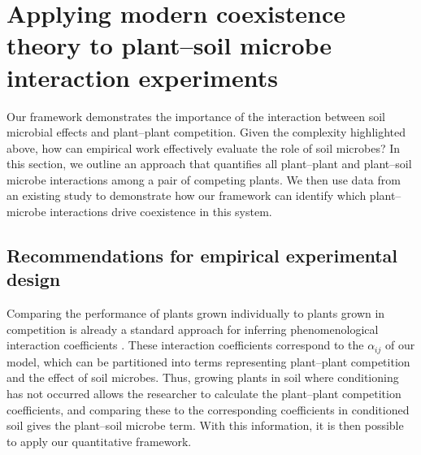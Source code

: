 \section{Applying modern coexistence theory to plant--soil microbe interaction experiments}
Our framework demonstrates the importance of the interaction between soil microbial effects and plant--plant competition. Given the complexity highlighted above, how can empirical work effectively evaluate the role of soil microbes? %
In this section, we outline an approach that quantifies all plant--plant and plant--soil microbe interactions among a pair of competing plants.
We then use data from an existing study \citep{Aguilera2017} to demonstrate how our framework can identify which plant--microbe interactions drive coexistence in this system.
\par



\subsection{Recommendations for empirical experimental design}
Comparing the performance of plants grown individually to plants grown in competition is already a standard approach for inferring phenomenological interaction coefficients \citep{Hart2018}. These interaction coefficients correspond to the $\alpha_{ij}$ of our model, which can be partitioned into terms representing plant--plant competition and the effect of soil microbes. Thus, growing plants in soil where conditioning has not occurred allows the researcher to calculate the plant--plant competition coefficients, and comparing these to the corresponding coefficients in conditioned soil gives the plant--soil microbe term. With this information, it is then possible to apply our quantitative framework.
\par


